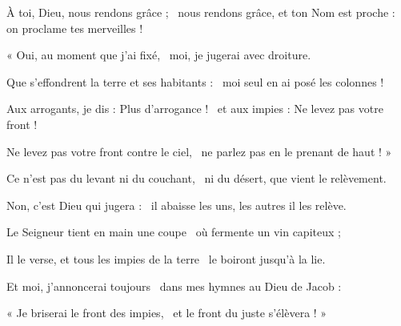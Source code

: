 \item À toi, Dieu, nous rendons grâce ;~\pscross{} nous rendons grâce, et ton Nom est proche :~\psstar{} on proclame tes merveilles !
\item « Oui, au moment que j'ai fixé,~\psstar{} moi, je jugerai avec droiture.
\item Que s'effondrent la terre et ses habitants :~\psstar{} moi seul en ai posé les colonnes !
\item Aux arrogants, je dis : Plus d'arrogance !~\psstar{} et aux impies : Ne levez pas votre front !
\item Ne levez pas votre front contre le ciel,~\psstar{} ne parlez pas en le prenant de haut ! »
\item Ce n'est pas du levant ni du couchant,~\psstar{} ni du désert, que vient le relèvement.
\item Non, c'est Dieu qui jugera :~\psstar{} il abaisse les uns, les autres il les relève.
\item Le Seigneur tient en main une coupe~\psstar{} où fermente un vin capiteux ;
\item Il le verse, et tous les impies de la terre~\psstar{} le boiront jusqu'à la lie.
\item Et moi, j'annoncerai toujours~\psstar{} dans mes hymnes au Dieu de Jacob :
\item « Je briserai le front des impies,~\psstar{} et le front du juste s'élèvera ! »
